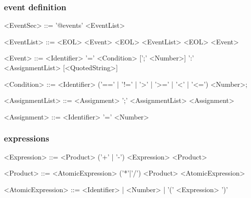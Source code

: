 \documentclass[a4paper]{article}
\begin{document}
\subsubsection*{event definition}
\begin{table} [h!]
\begin{grammar}
<EventSec> ::= '@events' <EventList>

<EventList> ::= <EOL> <Event> <EOL> <EventList>
  \alt <EOL> <Event>
  
<Event> ::= <Identifier> '=' <Condition> [';' <Number>] ':' <AssignmentList> [<QuotedString>]

<Condition> ::= <Identifier> ('==' | '!=' | '>' | '>=' | '<' | '<=') <Number>;

<AssignmentList> ::= <Assignment> ';' <AssignmentList>
  \alt <Assignment>
  
<Assignment> ::= <Identifier> '=' <Number>
\end{grammar}
\end{table}


\subsubsection*{expressions}
\begin{table}[h!]
\begin{grammar}
<Expression> ::= <Product> ('+' | '-') <Expression>
 \alt <Product>
 
<Product> ::= <AtomicExpression> ('*'|'/') <Product>
  \alt <AtomicExpression>
  
<AtomicExpression> ::= <Identifier> | <Number> | '(' <Expression> ')'
\end{grammar}
\end{table}
\end{document}
